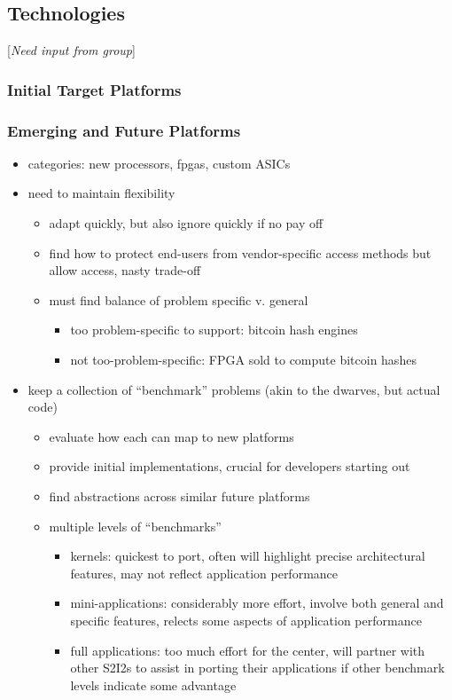 \subsection{Technologies} [\textit{Need input from group}]
\subsubsection{Initial Target Platforms}

\subsubsection{Emerging and Future Platforms}

\begin{itemize}
\item categories: new processors, fpgas, custom ASICs
\item need to maintain flexibility
  \begin{itemize}
  \item adapt quickly, but also ignore quickly if no pay off
  \item find how to protect end-users from vendor-specific access methods but allow access, nasty trade-off
  \item must find balance of problem specific v. general
    \begin{itemize}
    \item too problem-specific to support: bitcoin hash engines
    \item not too-problem-specific: FPGA sold to compute bitcoin hashes
    \end{itemize}
  \end{itemize}
\item keep a collection of ``benchmark'' problems (akin to the dwarves, but actual code)
  \begin{itemize}
  \item evaluate how each can map to new platforms
  \item provide initial implementations, crucial for developers starting out
  \item find abstractions across similar future platforms
  \item multiple levels of ``benchmarks''
    \begin{itemize}
    \item kernels: quickest to port, often will highlight precise architectural features, may not reflect application performance
    \item mini-applications: considerably more effort, involve both general and specific features, relects some aspects of application performance
    \item full applications: too much effort for the center, will partner with other S2I2s to assist in porting their applications if other benchmark levels indicate some advantage
    \end{itemize}
  \end{itemize}
\end{itemize}

